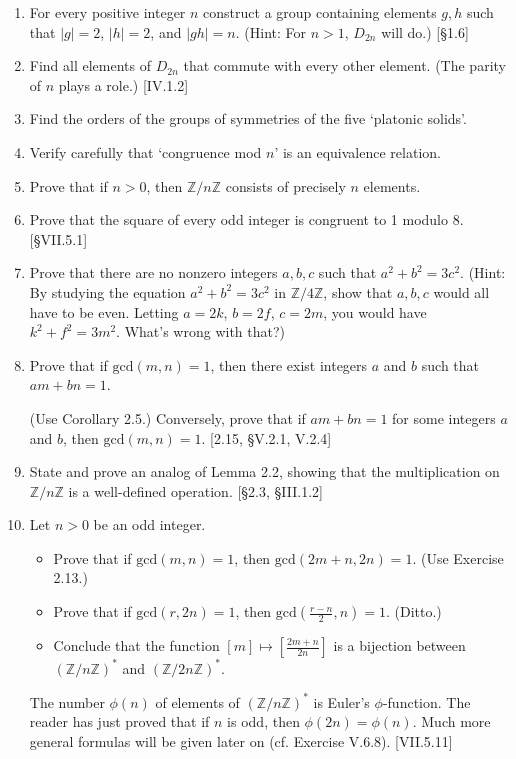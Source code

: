 \begin{enumerate}
    \item For every positive integer $n$ construct a group containing elements $g, h$ such that $|g|=2$, $|h|=2$, and $|gh|=n$. (Hint: For $n > 1$, $D_{2n}$ will do.) [\S1.6]

    \item Find all elements of $D_{2n}$ that commute with every other element. (The parity of $n$ plays a role.) [IV.1.2]

    \item Find the orders of the groups of symmetries of the five `platonic solids'.

    \item Verify carefully that `congruence mod $n$' is an equivalence relation.

    \item Prove that if $n > 0$, then $\mathbb{Z}/n\mathbb{Z}$ consists of precisely $n$ elements.

    \item Prove that the square of every odd integer is congruent to 1 modulo 8. [\S VII.5.1]

    \item Prove that there are no nonzero integers $a, b, c$ such that $a^2+b^2=3c^2$. (Hint: By studying the equation $a^2+b^2=3c^2$ in $\mathbb{Z}/4\mathbb{Z}$, show that $a, b, c$ would all have to be even. Letting $a=2k$, $b=2f$, $c=2m$, you would have $k^2+f^2=3m^2$. What's wrong with that?)

    \item Prove that if $\text{gcd}(m, n)=1$, then there exist integers $a$ and $b$ such that $am+bn=1$.

          (Use Corollary 2.5.) Conversely, prove that if $am+bn=1$ for some integers $a$ and $b$, then $\text{gcd}(m, n)=1$. [2.15, \S V.2.1, V.2.4]

    \item State and prove an analog of Lemma 2.2, showing that the multiplication on $\mathbb{Z}/n\mathbb{Z}$ is a well-defined operation. [\S2.3, \S III.1.2]

    \item Let $n > 0$ be an odd integer.
          \begin{itemize}
              \item Prove that if $\text{gcd}(m, n)=1$, then $\text{gcd}(2m+n, 2n)=1$. (Use Exercise 2.13.)
              \item Prove that if $\text{gcd}(r, 2n)=1$, then $\text{gcd}(\frac{r-n}{2}, n)=1$. (Ditto.)
              \item Conclude that the function $[m] \mapsto [\frac{2m+n}{2n}]$ is a bijection between $(\mathbb{Z}/n\mathbb{Z})^*$ and $(\mathbb{Z}/2n\mathbb{Z})^*$.
          \end{itemize}
          The number $\phi(n)$ of elements of $(\mathbb{Z}/n\mathbb{Z})^*$ is Euler's $\phi$-function. The reader has just proved that if $n$ is odd, then $\phi(2n) = \phi(n)$. Much more general formulas will be given later on (cf. Exercise V.6.8). [VII.5.11]


\end{enumerate}
